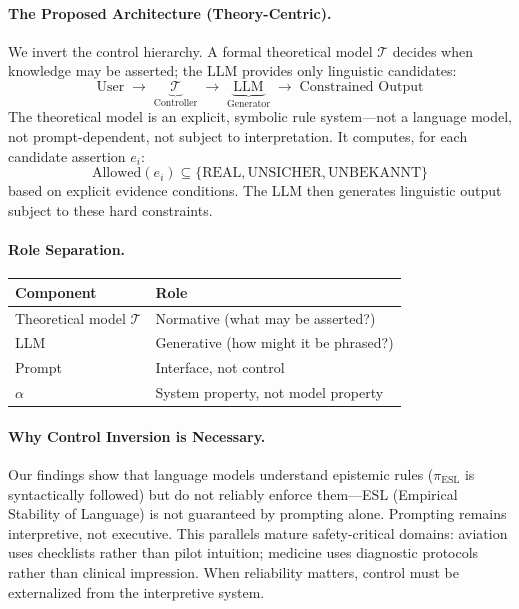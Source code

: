 \documentclass[11pt,a4paper]{article}
\begin{document}
\paragraph{The Proposed Architecture (Theory-Centric).}
We invert the control hierarchy. A formal theoretical model $\mathcal{T}$ decides when knowledge may be asserted; the LLM provides only linguistic candidates:
\[
\text{User} \;\rightarrow\; \underbrace{\mathcal{T}}_{\text{Controller}} \;\rightarrow\; \underbrace{\text{LLM}}_{\text{Generator}} \;\rightarrow\; \text{Constrained Output}
\]
The theoretical model is an explicit, symbolic rule system---not a language model, not prompt-dependent, not subject to interpretation. It computes, for each candidate assertion $e_i$:
\[
\text{Allowed}(e_i) \subseteq \{\text{REAL}, \text{UNSICHER}, \text{UNBEKANNT}\}
\]
based on explicit evidence conditions. The LLM then generates linguistic output subject to these hard constraints.

\paragraph{Role Separation.}
\begin{center}
\begin{tabular}{ll}
\toprule
\textbf{Component} & \textbf{Role} \\
\midrule
Theoretical model $\mathcal{T}$ & Normative (what may be asserted?) \\
LLM & Generative (how might it be phrased?) \\
Prompt & Interface, not control \\
$\alpha$ & System property, not model property \\
\bottomrule
\end{tabular}
\end{center}

\paragraph{Why Control Inversion is Necessary.}
Our findings show that language models understand epistemic rules ($\pi_{\text{ESL}}$ is syntactically followed) but do not reliably enforce them---ESL (Empirical Stability of Language) is not guaranteed by prompting alone. Prompting remains interpretive, not executive. This parallels mature safety-critical domains: aviation uses checklists rather than pilot intuition; medicine uses diagnostic protocols rather than clinical impression. When reliability matters, control must be externalized from the interpretive system.
\end{document}
